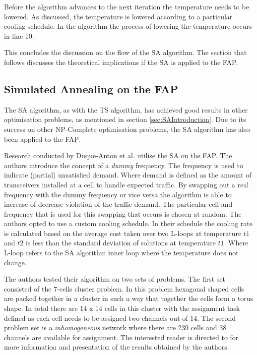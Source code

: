 Before the algorithm advances to the next iteration the temperature needs to be lowered. As discussed, the temperature is lowered according to a particular cooling schedule. In the algorithm the process of lowering the temperature occurs in line 10. 

This concludes the discussion on the flow of the SA algorithm. The section that follows discusses the theoretical implications if the \gls{SA} is applied to the \gls{FAP}.
\subsection{Simulated Annealing on the \gls{FAP}}
\label{sec:saonfap}
The \gls{SA} algorithm, as with the \gls{TS} algorithm, has achieved good results in other optimisation problems, as mentioned in section \ref{sec:SAIntroduction}. Due to its success on other NP-Complete optimisation problems, the \gls{SA} algorithm has also been applied to the \gls{FAP}.

Research conducted by Duque-Anton et al.\cite{SAChanAss} utilise the \gls{SA} on the FAP. The authors introduce the concept of a \emph{dummy} frequency. The frequency is used to indicate (partial) unsatisfied demand. Where demand is defined as the amount of transceivers installed at a cell to handle expected traffic. By swapping out a real frequency with the dummy frequency or vice versa the algorithm is able to increase of decrease violation of the traffic demand. The particular cell and frequency that is used for this swapping that occurs is chosen at random. The authors opted to use a custom cooling schedule. In their schedule the cooling rate is calculated based on the average cost taken over two L-loops at temperature $t1$ and $t2$ is less than the standard deviation of solutions at temperature $t1$. Where L-loop refers to the \gls{SA} algorithm inner loop where the temperature does not change. 

The authors tested their algorithm on two sets of problems. The first set consisted of the 7-cells cluster problem. In this problem hexagonal shaped cells are packed together in a cluster in such a way that together the cells form a torus shape. In total there are 14 x 14 cells in this cluster with the assignment task defined as each cell needs to be assigned two channels out of 14. The second problem set is a \emph{inhomogeneous} network where there are 239 cells and 38 channels are available for assignment. The interested reader is directed to \cite{SAChanAss} for more information and presentation of the results obtained by the authors.

